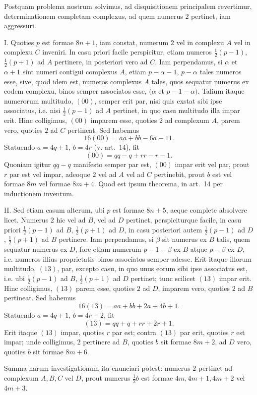 \documentclass[12pt]{article}
\begin{document}
Postquam problema nostrum solvimus, ad disquisitionem principalem revertimur, determinationem completam complexus, ad quem numerus $2$ pertinet, iam aggressuri.

I. Quoties $p$ est formae $8n+1$, iam constat, numerum $2$ vel in complexu $A$ vel in complexu $C$ inveniri. In casu priori facile perspicitur, etiam numeros $\frac12(p-1)$, $\frac12(p+1)$ ad $A$ pertinere, in posteriori vero ad $C$. Iam perpendamus, si $\alpha$ et $\alpha+1$ sint numeri contigui complexus $A$, etiam $p-\alpha-1$, $p-\alpha$ tales numeros esse, sive, quod idem est, numeros complexus $A$ tales, quos sequatur numerus ex eodem complexu, binos semper associatos esse, $(\alpha$ et $p-1-\alpha)$. Talium itaque numerorum multitudo, $(00)$, semper erit par, nisi quis exstat sibi ipse associatus, i.e. nisi $\frac12(p-1)$ ad $A$ pertinet, in quo casu multitudo illa impar erit. Hinc colligimus, $(00)$ imparem esse, quoties $2$ ad complexum $A$, parem vero, quoties $2$ ad $C$ pertineat. Sed habemus
\[
16(00)=aa+bb-6a-11.
\]
Statuendo $a=4q+1$, $b=4r$ (v. art.~14), fit
\[
(00)=qq-q+rr-r-1.
\]
Quoniam igitur $qq-q$ manifesto semper par est, $(00)$ impar erit vel par, prout $r$ par est vel impar, adeoque $2$ vel ad $A$ vel ad $C$ pertinebit, prout $b$ est vel formae $8m$ vel formae $8m+4$. Quod est ipsum theorema, in art.~14 per inductionem inventum.

II. Sed etiam casum alterum, ubi $p$ est formae $8n+5$, aeque complete absolvere licet. Numerus $2$ hic vel ad $B$, vel ad $D$ pertinet, perspiciturque facile, in casu priori $\frac12(p-1)$ ad $B$, $\frac12(p+1)$ ad $D$, in casu posteriori autem $\frac12(p-1)$ ad $D$, $\frac12(p+1)$ ad $B$ pertinere. Iam perpendamus, si $\beta$ sit numerus ex $B$ talis, quem sequatur numerus ex $D$, fore etiam numerum $p-1-\beta$ ex $B$ atque $p-\beta$ ex $D$, i.e. numeros illius proprietatis binos associatos semper adesse. Erit itaque illorum multitudo, $(13)$, par, excepto casu, in quo unus eorum sibi ipse associatus est, i.e. ubi $\frac12(p-1)$ ad $B$, $\frac12(p+1)$ ad $D$ pertinet; tunc scilicet $(13)$ impar erit. Hinc colligimus, $(13)$ parem esse, quoties $2$ ad $D$, imparem vero, quoties $2$ ad $B$ pertineat. Sed habemus
\[
16(13)=aa+bb+2a+4b+1.
\]
Statuendo $a=4q+1$, $b=4r+2$, fit
\[
(13)=qq+q+rr+2r+1.
\]
Erit itaque $(13)$ impar, quoties $r$ par est; contra $(13)$ par erit, quoties $r$ est impar; unde colligimus, $2$ pertinere ad $B$, quoties $b$ sit formae $8m+2$, ad $D$ vero, quoties $b$ sit formae $8m+6$.

Summa harum investigationum ita enunciari potest: numerus $2$ pertinet ad complexum $A,B,C$ vel $D$, prout numerus $\frac12 b$ est formae $4m,4m+1,4m+2$ vel $4m+3$.
\end{document}

